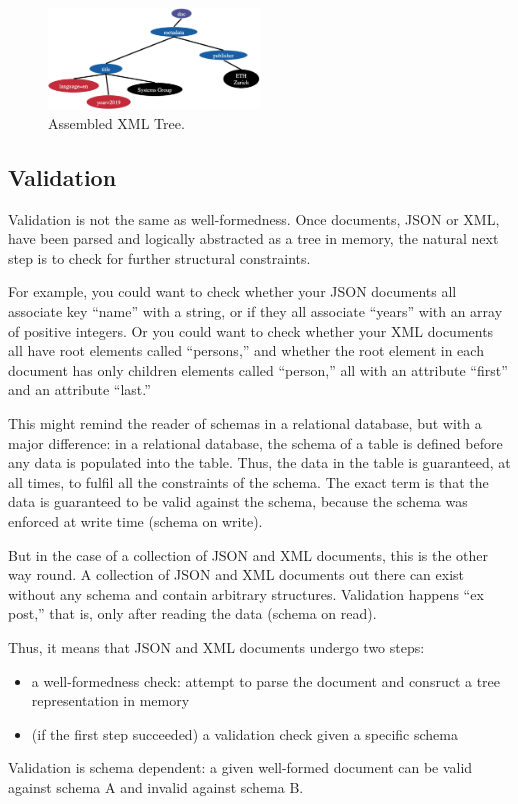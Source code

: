 \begin{figure}[h]
    \centering
    \includegraphics[width=0.5\textwidth]{Figures/XMLTree2.jpeg}
    \caption{Assembled XML Tree.}\label{fig:XMLTree2}
\end{figure}

\subsection{Validation}
Validation is not the same as well-formedness.
Once documents, JSON or XML, have been parsed and logically abstracted as a tree in memory, the natural next step is to check for further structural constraints.

For example, you could want to check whether your JSON documents all associate key “name” with a string, or if they all associate “years” with an array of positive integers. Or you could want to check whether your XML documents all have root elements called “persons,” and whether the root element in each document has only children elements called “person,” all with an attribute “first” and an attribute “last.”

This might remind the reader of schemas in a relational database, but with a major difference: in a relational database, the schema of a table is defined before any data is populated into the table. Thus, the data in the table is guaranteed, at all times, to fulfil all the constraints of the schema. The exact term is that the data is guaranteed to be valid against the schema, because the schema was enforced at write time (schema on write).

But in the case of a collection of JSON and XML documents, this is the other way round. A collection of JSON and XML documents out there can exist without any schema and contain arbitrary structures. Validation happens “ex post,” that is, only after reading the data (schema on read).

Thus, it means that JSON and XML documents undergo two steps:
\begin{itemize}
    \item a well-formedness check: attempt to parse the document and consruct a tree representation in memory
    \item (if the first step succeeded) a validation check given a specific schema
\end{itemize}
Validation is schema dependent: a given well-formed document can be valid against schema A and invalid against schema B.

